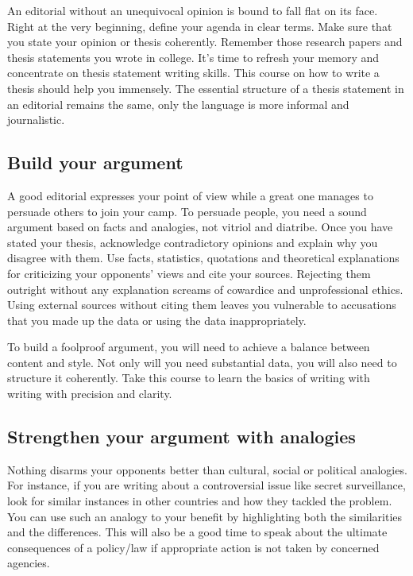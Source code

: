\documentclass{tufte-handout}\usepackage[]{graphicx}\usepackage[]{color}
\begin{document}
An editorial without an unequivocal opinion is bound to fall flat on its face. Right at the very beginning, define your agenda in clear terms. Make sure that you state your opinion or thesis coherently. Remember those research papers and thesis statements you wrote in college. It's time to refresh your memory and concentrate on thesis statement writing skills. This course on how to write a thesis should help you immensely. The essential structure of a thesis statement in an editorial remains the same, only the language is more informal and journalistic.

\subsection{Build your argument}

A good editorial expresses your point of view while a great one manages to persuade others to join your camp. To persuade people, you need a sound argument based on facts and analogies, not vitriol and diatribe. Once you have stated your thesis, acknowledge contradictory opinions and explain why you disagree with them. Use facts, statistics, quotations and theoretical explanations for criticizing your opponents' views and cite your sources. Rejecting them outright without any explanation screams of cowardice and unprofessional ethics. Using external sources without citing them leaves you vulnerable to accusations that you made up the data or using the data inappropriately. 

To build a foolproof argument, you will need to achieve a balance between content and style. Not only will you need substantial data, you will also need to structure it coherently. Take this course to learn the basics of writing with writing with precision and clarity.


\subsection{Strengthen your argument with analogies}

Nothing disarms your opponents better than cultural, social or political analogies. For instance, if you are writing about a controversial issue like secret surveillance, look for similar instances in other countries and how they tackled the problem. You can use such an analogy to your benefit by highlighting both the similarities and the differences. This will also be a good time to speak about the ultimate consequences of a policy/law if appropriate action is not taken by concerned agencies.
\end{document}

